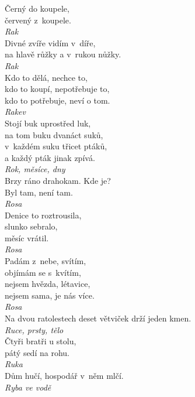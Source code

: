 \begin{multicols}{\value{columnsthindata}}
\noindent
Černý do koupele,\\
červený z~koupele.\\[1 mm]
{\sl Rak}\\

\noindent
Divné zvíře vidím v~díře,\\
na hlavě růžky a v~rukou nůžky.\\[1 mm]
{\sl Rak}\\

\noindent
Kdo to dělá, nechce to,\\
kdo to koupí, nepotřebuje to,\\
kdo to potřebuje, neví o tom.\\[1 mm]
{\sl Rakev}\\

\noindent
Stojí buk uprostřed luk,\\
na tom buku dvanáct suků,\\
v~každém suku třicet ptáků,\\
a každý pták jinak zpívá.\\[1 mm]
{\sl Rok, měsíce, dny}\\

\noindent
Brzy ráno drahokam. Kde je?\\
Byl tam, není tam.\\[1 mm]
{\sl Rosa}\\

\noindent
Denice to roztrousila,\\
slunko sebralo,\\
měsíc vrátil.\\[1 mm]
{\sl Rosa}\\

\noindent
Padám z~nebe, svítím,\\
objímám se s~kvítím,\\
nejsem hvězda, létavice,\\
nejsem sama, je nás více.\\[1 mm]
{\sl Rosa}\\

\noindent
Na dvou ratolestech deset větviček drží jeden kmen.\\[1 mm]
{\sl Ruce, prsty, tělo}\\

\noindent
Čtyři bratři u stolu, \\
pátý sedí na rohu.\\[1 mm]
{\sl Ruka}\\

\noindent
Dům hučí, hospodář v~něm mlčí.\\[1 mm]
{\sl Ryba ve vodě}\\


\end{multicols}
